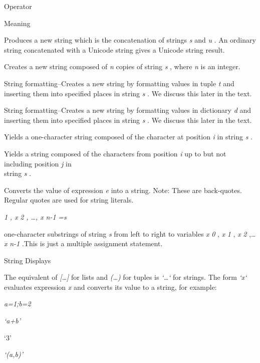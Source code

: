 Operator

Meaning



Produces a new string which is the
concatenation of strings \emph{s} and \emph{u} . An ordinary string
concatenated with a Unicode string gives a Unicode string result.





Creates a new string composed of
\emph{n} copies of string \emph{s} , where \emph{n} is an integer.



String formatting--Creates a new
string by formatting values in tuple \emph{t} and inserting them into
specified places in string \emph{s} . We discuss this later in the text.



String formatting--Creates a new
string by formatting values in dictionary \emph{d} and inserting them
into specified places in string \emph{s} . We discuss this later in the
text.



Yields a one-character string
composed of the character at position \emph{i} in string \emph{s} .



Yields a string composed of the
characters from position \emph{i} up to but not including position
\emph{j} in\\
string \emph{s} .



Converts the value of expression
\emph{e} into a string. Note: These are back-quotes. Regular quotes are
used for string literals.


\emph{1} \emph{, x} \emph{2} \emph{, \ldots{}, x} \emph{n-1} \emph{=s}

 one-character
substrings of string \emph{s} from left to right to variables \emph{x}
\emph{0} , \emph{x} \emph{1} , \emph{x} \emph{2} ,\ldots{} \emph{x}
\emph{n-1} .This is just a multiple assignment statement.

String Displays

The equivalent of
\emph{{[}\ldots{}{]}} for lists and \emph{(\ldots{})} for tuples is
\emph{`\ldots{}`} for strings. The form \emph{`x`} evaluates expression
\emph{x} and converts its value to a string, for example:


\emph{a=1;b=2}


\emph{`a+b'}

`3'


\emph{`(a,b)'}


